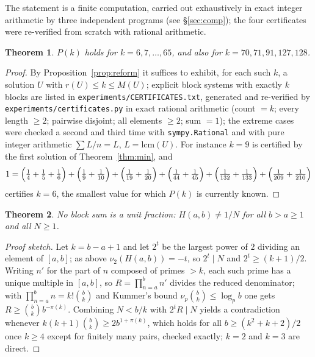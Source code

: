 \documentclass[11pt]{article}
\newtheorem{theorem}{Theorem}
\theoremstyle{definition}
\begin{document}
The statement is a finite computation, carried out exhaustively in exact integer arithmetic
by three independent programs (see \S\ref{sec:comp}); the four certificates were re-verified
from scratch with rational arithmetic.

\begin{theorem}\label{thm:k}
$P(k)$ holds for $k=6,7,\dots,65$, and also for $k=70,71,91,127,128$.
\end{theorem}

\begin{proof}
By Proposition~\ref{prop:reform} it suffices to exhibit, for each such $k$, a solution $U$
with $r(U)\le k\le M(U)$; explicit block systems with exactly $k$ blocks are listed in
\texttt{experiments/CERTIFICATES.txt}, generated and re-verified by
\texttt{experiments/certificates.py} in exact rational arithmetic (count $=k$; every length
$\ge2$; pairwise disjoint; all elements $\ge2$; sum $=1$); the extreme cases were checked a
second and third time with \texttt{sympy.Rational} and with pure integer arithmetic
$\sum L/n = L$, $L=\mathrm{lcm}(U)$. For instance $k=9$ is certified by the first solution
of Theorem~\ref{thm:min}, and
\[
1=\Bigl(\tfrac14+\tfrac15+\tfrac16\Bigr)+\Bigl(\tfrac19+\tfrac1{10}\Bigr)
+\Bigl(\tfrac1{19}+\tfrac1{20}\Bigr)+\Bigl(\tfrac1{44}+\tfrac1{45}\Bigr)
+\Bigl(\tfrac1{132}+\tfrac1{133}\Bigr)+\Bigl(\tfrac1{209}+\tfrac1{210}\Bigr)
\]
certifies $k=6$, the smallest value for which $P(k)$ is currently known. \qedhere
\end{proof}

\begin{theorem}\label{thm:unit}
No block sum is a unit fraction: $H(a,b)\ne1/N$ for all $b>a\ge1$ and all $N\ge1$.
\end{theorem}

\begin{proof}[Proof sketch]
Let $k=b-a+1$ and let $2^{t}$ be the largest power of $2$ dividing an element of $[a,b]$;
as above $\nu_2(H(a,b))=-t$, so $2^{t}\mid N$ and $2^{t}\ge(k+1)/2$. Writing $n'$ for the
part of $n$ composed of primes $>k$, each such prime has a unique multiple in $[a,b]$, so
$R=\prod_{n=a}^{b}n'$ divides the reduced denominator; with
$\prod_{n=a}^{b}n=k!\binom{b}{k}$ and Kummer's bound $\nu_p\binom{b}{k}\le\log_p b$ one gets
$R\ge\binom{b}{k}b^{-\pi(k)}$. Combining $N<b/k$ with $2^{t}R\mid N$ yields a contradiction
whenever $k(k+1)\binom{b}{k}\ge2b^{1+\pi(k)}$, which holds for all $b\ge(k^2+k+2)/2$ once
$k\ge4$ except for finitely many pairs, checked exactly; $k=2$ and $k=3$ are direct.
\end{proof}
\end{document}
